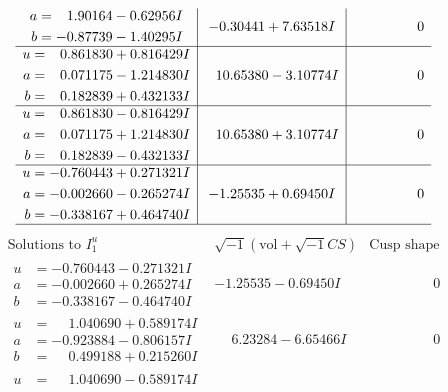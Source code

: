 \documentclass[1p]{elsarticle_modified}
\theoremstyle{definition}
\newcommand{\I}{\sqrt{-1}}
\begin{document}
$$\begin{array}{c|c|c}
\begin{aligned}
a &= \phantom{-}1.90164 - 0.62956 I \\
b &= -0.87739 - 1.40295 I\end{aligned}
 & -0.30441 + 7.63518 I & \phantom{-0.000000 } 0 \\ \hline\begin{aligned}
u &= \phantom{-}0.861830 + 0.816429 I \\
a &= \phantom{-}0.071175 - 1.214830 I \\
b &= \phantom{-}0.182839 + 0.432133 I\end{aligned}
 & \phantom{-}10.65380 - 3.10774 I & \phantom{-0.000000 } 0 \\ \hline\begin{aligned}
u &= \phantom{-}0.861830 - 0.816429 I \\
a &= \phantom{-}0.071175 + 1.214830 I \\
b &= \phantom{-}0.182839 - 0.432133 I\end{aligned}
 & \phantom{-}10.65380 + 3.10774 I & \phantom{-0.000000 } 0 \\ \hline\begin{aligned}
u &= -0.760443 + 0.271321 I \\
a &= -0.002660 - 0.265274 I \\
b &= -0.338167 + 0.464740 I\end{aligned}
 & -1.25535 + 0.69450 I & \phantom{-0.000000 } 0\\
 \hline 
 \end{array}$$\newpage$$\begin{array}{c|c|c}  
\text{Solutions to }I^u_{1}& \I (\text{vol} + \sqrt{-1}CS) & \text{Cusp shape}\\
 \hline 
\begin{aligned}
u &= -0.760443 - 0.271321 I \\
a &= -0.002660 + 0.265274 I \\
b &= -0.338167 - 0.464740 I\end{aligned}
 & -1.25535 - 0.69450 I & \phantom{-0.000000 } 0 \\ \hline\begin{aligned}
u &= \phantom{-}1.040690 + 0.589174 I \\
a &= -0.923884 - 0.806157 I \\
b &= \phantom{-}0.499188 + 0.215260 I\end{aligned}
 & \phantom{-}6.23284 - 6.65466 I & \phantom{-0.000000 } 0 \\ \hline\begin{aligned}
u &= \phantom{-}1.040690 - 0.589174 I \\

\end{aligned}
\end{array}$$
\end{document}
